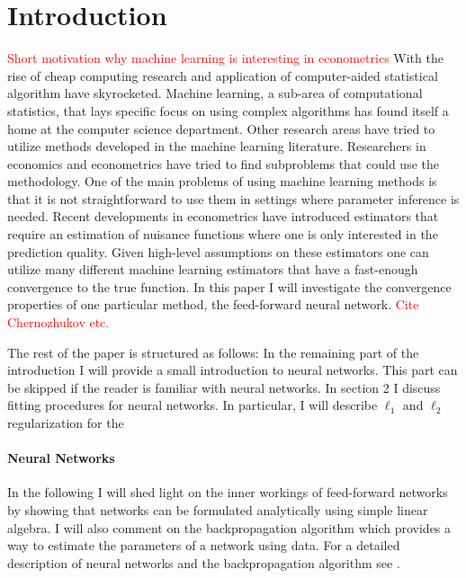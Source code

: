 \section{Introduction}

\textcolor{red}{Short motivation why machine learning is interesting in econometrics}
With the rise of cheap computing research and application of computer-aided statistical
algorithm have skyrocketed. Machine learning, a sub-area of computational statistics,
that lays specific focus on using complex algorithms has found itself a home at the
computer science department. Other research areas have tried to utilize methods
developed in the machine learning literature. Researchers in economics and econometrics
have tried to find subproblems that could use the methodology. One of the main problems
of using machine learning methods is that it is not straightforward to use them in
settings where parameter inference is needed. Recent developments in econometrics have
introduced estimators that require an estimation of nuisance functions where one is only
interested in the prediction quality. Given high-level assumptions on these estimators
one can utilize many different machine learning estimators that have a fast-enough
convergence to the true function. In this paper I will investigate the convergence
properties of one particular method, the feed-forward neural network.
\textcolor{red}{Cite Chernozhukov etc.}

The rest of the paper is structured as follows: In the remaining part of the
introduction I will provide a small introduction to neural networks. This part can be
skipped if the reader is familiar with neural networks. In section 2 I discuss fitting
procedures for neural networks. In particular, I will describe $\ell_1$ and $\ell_2$
regularization for the

\paragraph{Neural Networks}

In the following I will shed light on the inner workings of feed-forward networks by
showing that networks can be formulated analytically using simple linear algebra. I will
also comment on the backpropagation algorithm which provides a way to estimate the
parameters of a network using data. For a detailed description of neural networks and
the backpropagation algorithm see \cite{Goodfellow.2016, Murphy.2012, Hastie.2008}.


